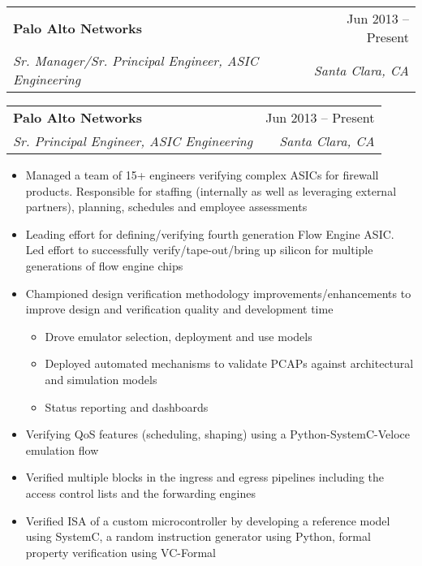 \documentclass[letterpaper,12pt]{article}[leftmargin=*]
\makeatletter
\def \entryspacing {-0pt}
\newcommand{\resumeEntryStart}{\begin{itemize}[leftmargin=2.5mm]}
\newcommand{\resumeEntryEnd}{\end{itemize}\vspace{\entryspacing}}
\newcommand{\resumeItemListStart}{\begin{itemize}[leftmargin=4.5mm]}
\newcommand{\resumeItemListEnd}{\end{itemize}}
\newcommand{\resumeItem}[1]{
\item\small{
  {#1 \vspace{-2pt}}
}
}
\newcommand{\resumeEntryTSDL}[4]{
  \vspace{-1pt}\item[]
  \begin{tabularx}{0.97\textwidth}{X@{\hspace{60pt}}r}
    \textbf{\color{primary}#1} & {\firabook\color{accent}\small#2} \\
    \textit{\color{accent}\small#3} & \textit{\color{accent}\small#4} \\
  \end{tabularx}\vspace{-6pt}
}
\newcommand{\resumeEntryTSDLpart}[2]{
  \vspace{-6pt}\item[]
  \begin{tabularx}{0.97\textwidth}{X@{\hspace{60pt}}r}
    \textit{\color{accent}\small#1} & \textit{\color{accent}\small#2} \\
  \end{tabularx}\vspace{-6pt}
}
\makeatother
\begin{document}
\resumeEntryStart
{} {
\resumeEntryTSDL
    {Palo Alto Networks}{Jun 2013 -- Present}
    {Sr. Manager/Sr. Principal Engineer, ASIC Engineering}{Santa Clara, CA}
}{
\resumeEntryTSDL
    {Palo Alto Networks}{Jun 2013 -- Present}
    {Sr. Principal Engineer, ASIC Engineering}{Santa Clara, CA}
}
    \resumeItemListStart
    \resumeItem {Managed a team of 15+ engineers verifying complex ASICs for firewall products. Responsible for staffing (internally as well as leveraging external partners), planning, schedules and employee assessments}
    \resumeItem {Leading effort for defining/verifying fourth generation Flow Engine ASIC. Led effort to successfully verify/tape-out/bring up silicon for multiple generations of flow engine chips}
    \resumeItem {Championed design verification methodology improvements/enhancements to improve design and verification quality and development time}
        \resumeItemListStart    
        \resumeItem {Drove emulator selection, deployment and use models}        
        \resumeItem {Deployed automated mechanisms to validate PCAPs against architectural and simulation models}
        \resumeItem {Status reporting and dashboards}
        \resumeItemListEnd    
     \resumeItem {Verifying QoS features (scheduling, shaping) using a Python-SystemC-Veloce emulation flow}
     \resumeItem {Verified multiple blocks in the ingress and egress pipelines including the access control lists and the forwarding engines}
     \resumeItem {Verified ISA of a custom microcontroller by developing a reference model using SystemC, a random instruction generator using Python, formal property verification using VC-Formal}
    \resumeItemListEnd
\resumeEntryEnd
\end{document}
